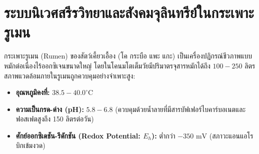 \section{ระบบนิเวศสรีรวิทยาและสังคมจุลินทรีย์ในกระเพาะรูเมน}

กระเพาะรูเมน (Rumen) ของสัตว์เคี้ยวเอื้อง (โค กระบือ แพะ แกะ) เป็นเครื่องปฏิกรณ์ชีวภาพแบบหมักต่อเนื่องไร้ออกซิเจนขนาดใหญ่ โดยในโคนมโตเต็มวัยมีปริมาตรจุสารหมักได้ถึง $100 - 250\text{ ลิตร}$ สภาพแวดล้อมภายในรูเมนถูกควบคุมอย่างจำเพาะสูง:
\begin{itemize}
    \item \textbf{อุณหภูมิคงที่:} $38.5 - 40.0^\circ\text{C}$
    \item \textbf{ความเป็นกรด-ด่าง (pH):} $5.8 - 6.8$ (ควบคุมด้วยน้ำลายที่มีสารบัฟเฟอร์ไบคาร์บอเนตและฟอสเฟตสูงถึง 150 ลิตรต่อวัน)
    \item \textbf{ศักย์ออกซิเดชัน-รีดักชัน (Redox Potential: $E_h$):} ต่ำกว่า $-350\text{ mV}$ (สภาวะแอนแอโรบิกเข้มงวด)
\end{itemize}

